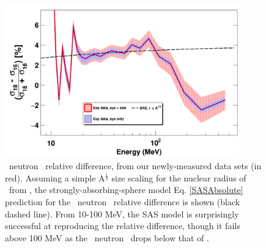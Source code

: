 \begin{figure}[ht!]
    \centering
    \includegraphics[width=0.9\textwidth]{figures/relativeDiff_O18O16.png}
    \caption[\oSixEight\ neutron \tot\ relative difference]
    {\oSixEight\ neutron \tot\ relative difference, from our newly-measured
        data sets (in red). Assuming a simple A$^{\frac{1}{3}}$ size scaling for the
        nuclear radius of \oEight\ from \oSix, the strongly-absorbing-sphere model 
        Eq. \ref{SASAbsolute} prediction for the \oSixEight\ neutron \tot\ relative
        difference is shown (black dashed line). From 10-100 MeV, the SAS
        model is surprisingly successful at reproducing the relative difference,
        though it fails above 100 MeV as the \oEight\ neutron \tot\ drops below
    that of \oSix.}
    \label{IsotopicDifferenceO}
\end{figure}

